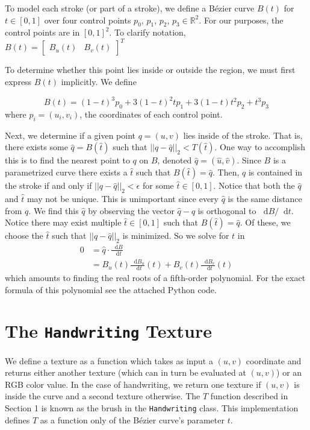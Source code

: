 \documentclass[12pt]{article}
\newcommand*\diff{\mathop{}\!\mathrm{d}}
\begin{document}
To model each stroke (or part of a stroke), we define a B\'ezier curve $B(t)$ for $t \in [0,1]$ over four control points $p_0$, $p_1$, $p_2$, $p_3 \in \mathbb{R}^2$. For our purposes, the control points are in $[0,1]^2$. To clarify notation, $B(t) = \begin{bmatrix} B_u(t) & B_v(t) \end{bmatrix}^T$

To determine whether this point lies inside or outside the region, we must first express $B(t)$ implicitly. We define

\[
	B(t) = (1 - t)^3 p_0 + 3(1 - t)^2 t p_1 + 3(1 - t)t^2 p_2 + t^3 p_3
\]
where $p_i = (u_i, v_i)$, the coordinates of each control point.

Next, we determine if a given point $q = (u,v)$ lies inside of the stroke. That is, there exists some $\hat{q} = B(\hat{t})$ such that $||q - \hat{q}||_2 < T(\hat{t})$. One way to accomplish this is to find the nearest point to $q$ on $B$, denoted $\hat{q} = (\hat{u}, \hat{v})$. Since $B$ is a parametrized curve there exists a $\hat{t}$ such that $B(\hat{t}) = \hat{q}$. Then, $q$ is contained in the stroke if and only if $||q - \hat{q}||_2 < \epsilon$ for some $\hat{t} \in [0,1]$. Notice that both the $\hat{q}$ and $\hat{t}$ may not be unique. This is unimportant since every $\hat{q}$ is the same distance from $q$. We find this $\hat{q}$ by observing the vector $\hat{q} - q$ is orthogonal to $\diff B / \diff t$. Notice there may exist multiple $\hat{t} \in [0,1]$ such that $B(\hat{t}) = \hat{q}$. Of these, we choose the $\hat{t}$ such that $||q - \hat{q}||_2$ is minimized. So we solve for $t$ in
\begin{align}
 0 &= \hat{q} \cdot \frac{\diff B}{\diff t} \nonumber \\
  &= B_u(t)\frac{\diff B_u}{\diff t}(t) + B_v(t)\frac{\diff B_v}{\diff t}(t) \label{poly}
\end{align}
which amounts to finding the real roots of a fifth-order polynomial. For the exact formula of this polynomial see the attached Python code.

\section{The \texttt{Handwriting} Texture}
We define a texture as a function which takes as input a $(u,v)$ coordinate and returns either another texture (which can in turn be evaluated at $(u,v)$) or an RGB color value. In the case of handwriting, we return one texture if $(u,v)$ is inside the curve and a second texture otherwise. The $T$ function described in Section 1 is known as the brush in the \texttt{Handwriting} class. This implementation defines $T$ as a function only of the B\'ezier curve's parameter $t$.
\end{document}
